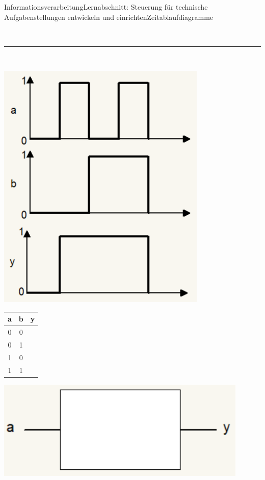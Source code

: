 \documentclass[oneside,openany,headings=optiontotoc,11pt,numbers=noenddot]{scrreprt}
\begin{document}
\begin{worksheet}{Informationsverarbeitung}{Lernabschnitt: Steuerung für technische Aufgabenstellungen entwickeln und einrichten}{Zeitablaufdiagramme}
\begin{framed}
\begin{minipage}{0.65\textwidth}
\begin{minipage}{0.65\textwidth}
				\end{minipage}
			\end{minipage}\\
			\par\noindent
			\rule{0.98\textwidth}{0.1pt}\\
			\par\noindent
			\begin{minipage}{0.35\textwidth}
				\includegraphics[width=0.75\textwidth]{99_Bilder/04_TI/04_03.png}
			\end{minipage}
			\hfill
			\begin{minipage}{0.65\textwidth}
				\begin{minipage}{0.25\textwidth}
					\begin{tabular}{cc|c}
						a & b& y\\
						\hline
						0 & 0 & \\
						0 & 1 & \\
						1 & 0 & \\
						1 & 1 &
					\end{tabular}
				\end{minipage}
				\hfill
				\begin{minipage}{0.65\textwidth}
					\includegraphics[width=0.9\textwidth]{99_Bilder/04_TI/04_01_G.png}

\end{minipage}
\end{minipage}
\end{framed}
\end{worksheet}
\end{document}

